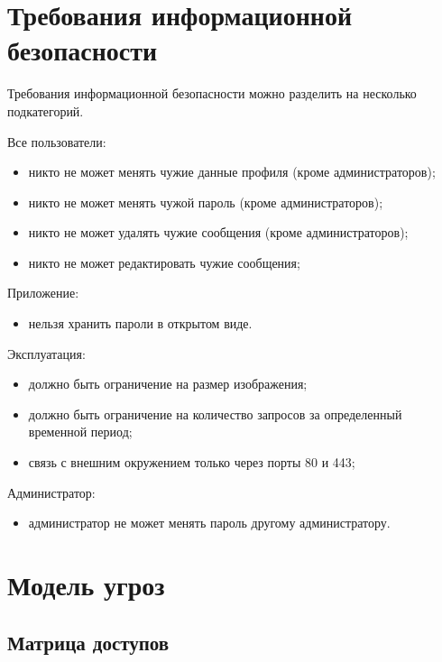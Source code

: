 \documentclass[oneside, final, 14pt]{extarticle}
\begin{document}
\section{Требования информационной безопасности}

Требования информационной безопасности можно разделить на несколько подкатегорий.

\vspace{0.5cm}

Все пользователи:
\begin{itemize}
\item{никто не может менять чужие данные профиля (кроме администраторов);}
\item{никто не может менять чужой пароль (кроме администраторов);}
\item{никто не может удалять чужие сообщения (кроме администраторов);}
\item{никто не может редактировать чужие сообщения;}
\end{itemize}

\vspace{0.5cm}

Приложение:
\begin{itemize}
\item{нельзя хранить пароли в открытом виде.}
\end{itemize}

\vspace{0.5cm}

Эксплуатация:
\begin{itemize}
\item{должно быть ограничение на размер изображения;}
\item{должно быть ограничение на количество запросов за определенный временной период;}
\item{связь с внешним окружением только через порты 80 и 443;}
\end{itemize}

\vspace{0.5cm}

Администратор:
\begin{itemize}
\item{администратор не может менять пароль другому администратору.}
\end{itemize}

\section{Модель угроз}
\subsection{Матрица доступов}
\end{document}
